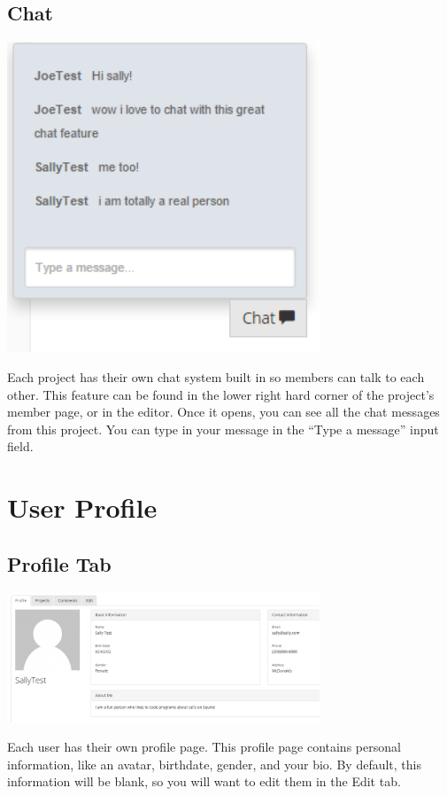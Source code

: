 \documentclass[11pt]{report}
\begin{document}
\subsection{Chat}
	\begin{center}
           \includegraphics[width=0.7\textwidth]{userguide/chat}
    \end{center}
    Each project has their own chat system built in so members can talk to each other. This feature can be found in the lower right hard corner of the project’s member page, or in the editor. Once it opens, you can see all the chat messages from this project. You can type in your message in the “Type a message” input field. 


\section{User Profile}
\subsection{Profile Tab}   
	\begin{center}
           \includegraphics[width=0.7\textwidth]{userguide/profile}
    \end{center}
    Each user has their own profile page. This profile page contains personal information, like an avatar, birthdate, gender, and your bio. By default, this information will be blank, so you will want to edit them in the Edit tab.
\end{document}
